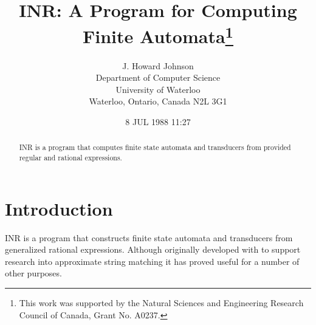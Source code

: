\title{INR: A Program for Computing\\Finite Automata\thanks{This work was
	supported by the Natural Sciences and Engineering Research Council
	of Canada, Grant No. A0237.}}
\author{J. Howard Johnson\\
	Department of Computer Science\\
	University of Waterloo\\
	Waterloo, Ontario, Canada N2L 3G1}
\date{8 JUL 1988 11:27}
\newcommand{\lhead}{J. Howard Johnson}
\newcommand{\rhead}{INR: A Program for Computing Finite Automata}


\maketitle
\begin{abstract}
INR is a program that computes finite state automata and transducers from
provided regular and rational expressions.
\end{abstract}

\section{Introduction}
INR is a program that constructs finite state automata and transducers from
generalized rational expressions.
Although originally developed with to support research into
approximate string matching \cite{Johnson83} it has proved useful for a
number of other purposes.

